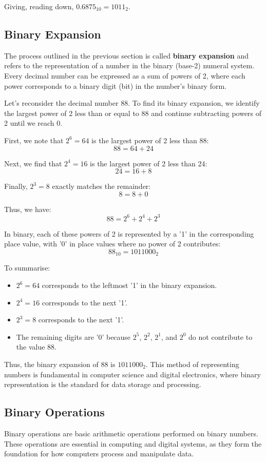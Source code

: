 Giving, reading down, $0.6875_{10} = 1011_2$.

\subsection*{Binary Expansion}

The process outlined in the previous section is called \textbf{binary expansion} and refers to the representation of a number in the binary (base-2) numeral system. Every decimal number can be expressed as a sum of powers of 2, where each power corresponds to a binary digit (bit) in the number's binary form.

Let's reconsider the decimal number 88. To find its binary expansion, we identify the largest power of 2 less than or equal to 88 and continue subtracting powers of 2 until we reach 0.

First, we note that $2^6 = 64$ is the largest power of 2 less than 88:
\[
88 = 64 + 24
\]

Next, we find that $2^4 = 16$ is the largest power of 2 less than 24:
\[
24 = 16 + 8
\]

Finally, $2^3 = 8$ exactly matches the remainder:
\[
8 = 8 + 0
\]

Thus, we have:
\[
88 = 2^6 + 2^4 + 2^3
\]

In binary, each of these powers of 2 is represented by a '1' in the corresponding place value, with '0' in place values where no power of 2 contributes:
\[
88_{10} = 1011000_2
\]

To summarise:
\begin{itemize}
    \item $2^6 = 64$ corresponds to the leftmost '1' in the binary expansion.
    \item $2^4 = 16$ corresponds to the next '1'.
    \item $2^3 = 8$ corresponds to the next '1'.
    \item The remaining digits are '0' because $2^5$, $2^2$, $2^1$, and $2^0$ do not contribute to the value 88.
\end{itemize}

Thus, the binary expansion of 88 is $1011000_2$. This method of representing numbers is fundamental in computer science and digital electronics, where binary representation is the standard for data storage and processing.

\subsection*{Binary Operations}
Binary operations are basic arithmetic operations performed on binary numbers. These operations are essential in computing and digital systems, as they form the foundation for how computers process and manipulate data.

